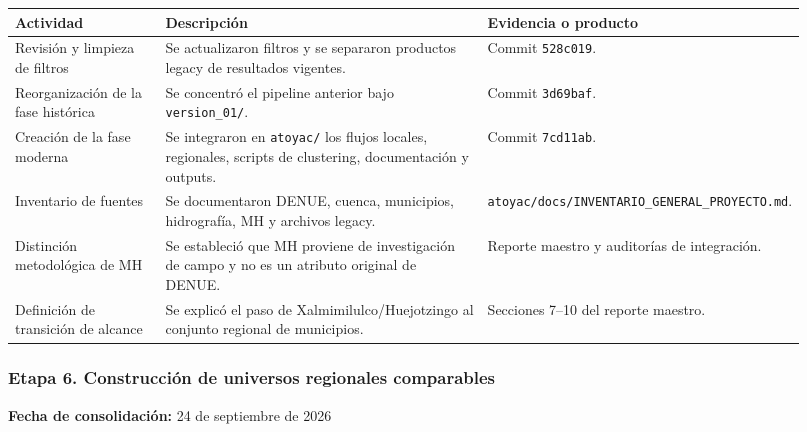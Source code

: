 \documentclass[
  spanish,
]{article}
\newcounter{none} %
\begin{document}
{\def\LTcaptype{none} %
\begin{longtable}[]{@{}p{0.20\linewidth}p{0.44\linewidth}p{0.28\linewidth}@{}}
\toprule\noalign{}
Actividad & Descripción & Evidencia o producto \\
\midrule\noalign{}
\endhead
\bottomrule\noalign{}
\endlastfoot
Revisión y limpieza de filtros & Se actualizaron filtros y se separaron
productos legacy de resultados vigentes. & Commit \texttt{528c019}. \\
Reorganización de la fase histórica & Se concentró el pipeline anterior
bajo \texttt{version\_01/}. & Commit \texttt{3d69baf}. \\
Creación de la fase moderna & Se integraron en \texttt{atoyac/} los
flujos locales, regionales, scripts de clustering, documentación y
outputs. & Commit \texttt{7cd11ab}. \\
Inventario de fuentes & Se documentaron DENUE, cuenca, municipios,
hidrografía, MH y archivos legacy. &
\texttt{atoyac/docs/INVENTARIO\_GENERAL\_PROYECTO.md}. \\
Distinción metodológica de MH & Se estableció que MH proviene de
investigación de campo y no es un atributo original de DENUE. & Reporte
maestro y auditorías de integración. \\
Definición de transición de alcance & Se explicó el paso de
Xalmimilulco/Huejotzingo al conjunto regional de municipios. & Secciones
7--10 del reporte maestro. \\
\end{longtable}
}

\subsubsection{Etapa 6. Construcción de universos regionales
comparables}\label{etapa-6-construcciuxf3n-de-universos-regionales-comparables}

\textbf{Fecha de consolidación:} 24 de septiembre de 2026
\end{document}
